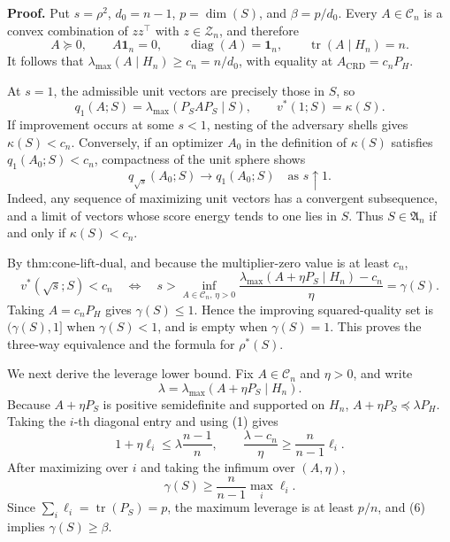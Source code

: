\textbf{Proof.}
Put \(s=\rho^2\), \(d_0=n-1\), \(p=\dim(S)\), and \(\beta=p/d_0\).  Every \(A\in\mathcal C_n\) is a convex combination of \(zz^\top\) with \(z\in\mathcal Z_n\), and therefore
\[
A\succeq0,\qquad A\mathbf1_n=0,\qquad
\operatorname{diag}(A)=\mathbf1_n,\qquad
\operatorname{tr}(A\mid H_n)=n.
\tag{1}
\]
It follows that \(\lambda_{\max}(A\mid H_n)\geq c_n=n/d_0\), with equality at \(A_{\mathrm{CRD}}=c_nP_H\).

At \(s=1\), the admissible unit vectors are precisely those in \(S\), so
\[
q_1(A;S)=\lambda_{\max}(P_SAP_S\mid S),
\qquad v^*(1;S)=\kappa(S).
\tag{2}
\]
If improvement occurs at some \(s<1\), nesting of the adversary shells gives \(\kappa(S)<c_n\).  Conversely, if an optimizer \(A_0\) in the definition of \(\kappa(S)\) satisfies \(q_1(A_0;S)<c_n\), compactness of the unit sphere shows
\[
q_{\sqrt{s}}(A_0;S)\longrightarrow q_1(A_0;S)
\quad\text{as }s\uparrow1.
\tag{3}
\]
Indeed, any sequence of maximizing unit vectors has a convergent subsequence, and a limit of vectors whose score energy tends to one lies in \(S\).  Thus \(S\in\mathfrak A_n\) if and only if \(\kappa(S)<c_n\).

By \(\text{thm:cone-lift-dual}\), and because the multiplier-zero value is at least \(c_n\),
\[
v^*(\sqrt{s};S)<c_n
\quad\Longleftrightarrow\quad
s>\inf_{A\in\mathcal C_n,\,\eta>0}
\frac{\lambda_{\max}(A+\eta P_S\mid H_n)-c_n}{\eta}
=\gamma(S).
\tag{4}
\]
Taking \(A=c_nP_H\) gives \(\gamma(S)\leq1\).  Hence the improving squared-quality set is \((\gamma(S),1]\) when \(\gamma(S)<1\), and is empty when \(\gamma(S)=1\).  This proves the three-way equivalence and the formula for \(\rho^*(S)\).

We next derive the leverage lower bound.  Fix \(A\in\mathcal C_n\) and \(\eta>0\), and write
\[
\lambda=\lambda_{\max}(A+\eta P_S\mid H_n).
\]
Because \(A+\eta P_S\) is positive semidefinite and supported on \(H_n\),
\(A+\eta P_S\preceq\lambda P_H\).  Taking the \(i\)-th diagonal entry and using (1) gives
\[
1+\eta\ell_i\leq\lambda\frac{n-1}{n},
\qquad
\frac{\lambda-c_n}{\eta}\geq\frac{n}{n-1}\ell_i.
\tag{5}
\]
After maximizing over \(i\) and taking the infimum over \((A,\eta)\),
\[
\gamma(S)\geq\frac{n}{n-1}\max_i\ell_i.
\tag{6}
\]
Since \(\sum_i\ell_i=\operatorname{tr}(P_S)=p\), the maximum leverage is at least \(p/n\), and (6) implies \(\gamma(S)\geq\beta\).

